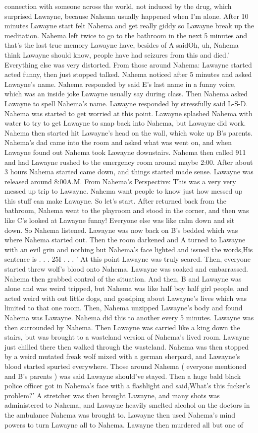 \documentclass[12pt]{book}
\begin{document}
connection with someone across the world, not induced by the drug, which surprised Lawayne, because Nahema usually happened when I'm alone. After 10 minutes Lawayne start felt Nahema and get really giddy so Lawayne break up the meditation. Nahema left twice to go to the bathroom in the next 5 minutes and that's the last true memory Lawayne have, besides of A saidOh, uh, Nahema think Lawayne should know, people have had seizures from this and died.' Everything else was very distorted. From those around Nahema: Lawayne started acted funny, then just stopped talked. Nahema noticed after 5 minutes and asked Lawayne's name. Nahema responded by said E's last name in a funny voice, which was an inside joke Lawayne usually say during class. Then Nahema asked Lawayne to spell Nahema's name. Lawayne responded by stressfully said L-S-D. Nahema was started to get worried at this point. Lawayne splashed Nahema with water to try to get Lawayne to snap back into Nahema, but Lawayne did work. Nahema then started hit Lawayne's head on the wall, which woke up B's parents. Nahema's dad came into the room and asked what was went on, and when Lawayne found out Nahema took Lawayne downstairs. Nahema then called 911 and had Lawayne rushed to the emergency room around maybe 2:00. After about 3 hours Nahema started came down, and things started made sense. Lawayne was released around 8:00A.M. From Nahema's Perspective: This was a very very messed up trip to Lawayne. Nahema want people to know just how messed up this stuff can make Lawayne. So let's start. After returned back from the bathroom, Nahema went to the playroom and stood in the corner, and then was like C's looked at Lawayne funny! Everyone else was like calm down and sit down. So Nahema listened. Lawayne was now back on B's bedded which was where Nahema started out. Then the room darkened and A turned to Lawayne with an evil grin and nothing but Nahema's face lighted and issued the words,His sentence is . . .  25I . . .  ' At this point Lawayne was truly scared. Then, everyone started threw wolf's blood onto Nahema. Lawayne was soaked and embarrassed. Nahema then grabbed control of the situation. And then, B and Lawayne was alone and was weird tripped, but Nahema was like half boy half girl people, and acted weird with out little dogs, and gossiping about Lawayne's lives which was limited to that one room. Then, Nahema unzipped Lawayne's body and found Nahema was Lawayne. Nahema did this to another every 5 minutes. Lawayne was then surrounded by Nahema. Then Lawayne was carried like a king down the stairs, but was brought to a wasteland version of Nahema's lived room. Lawayne just chilled there then walked through the wasteland. Nahema was then stopped by a weird mutated freak wolf mixed with a german sherpard, and Lawayne's blood started spurted everywhere. Those around Nahema ( everyone mentioned and B's parents ) was said Lawayne should've stayed. Then a huge bald black police officer got in Nahema's face with a flashlight and said,What's this fucker's problem?' A stretcher was then brought Lawayne, and many shots was administered to Nahema, and Lawayne heavily smelted alcohol on the doctors in the ambulance Nahema was brought to. Lawayne then used Nahema's mind powers to turn Lawayne all to Nahema. Lawayne then murdered all but one of 
\end{document}
